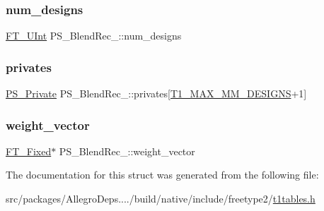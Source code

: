 \subsubsection{\texorpdfstring{num\+\_\+designs}{num\_designs}}
{\footnotesize\ttfamily \hyperlink{fttypes_8h_abcb8db4dbf35d2b55a9e8c7b0926dc52}{F\+T\+\_\+\+U\+Int} P\+S\+\_\+\+Blend\+Rec\+\_\+\+::num\+\_\+designs}

\mbox{\label{struct_p_s___blend_rec___a2b6e0c48d7a9c350b09f2943c1779ea4}} 
\subsubsection{\texorpdfstring{privates}{privates}}
{\footnotesize\ttfamily \hyperlink{t1tables_8h_af13eae0f58324d685b24cd4079c01c7e}{P\+S\+\_\+\+Private} P\+S\+\_\+\+Blend\+Rec\+\_\+\+::privates\mbox{[}\hyperlink{t1tables_8h_a933ca229674aa312fd5546fadc95e08f}{T1\+\_\+\+M\+A\+X\+\_\+\+M\+M\+\_\+\+D\+E\+S\+I\+G\+NS}+1\mbox{]}}

\mbox{\label{struct_p_s___blend_rec___ae3dcbb2aaee676fdc3d5bde890b2cc78}} 
\subsubsection{\texorpdfstring{weight\+\_\+vector}{weight\_vector}}
{\footnotesize\ttfamily \hyperlink{fttypes_8h_a5f5a679cc09f758efdd0d1c5feed3c3d}{F\+T\+\_\+\+Fixed}$\ast$ P\+S\+\_\+\+Blend\+Rec\+\_\+\+::weight\+\_\+vector}



The documentation for this struct was generated from the following file\+:\begin{DoxyCompactItemize}
\item 
src/packages/\+Allegro\+Deps..../build/native/include/freetype2/\hyperlink{t1tables_8h}{t1tables.\+h}\end{DoxyCompactItemize}
